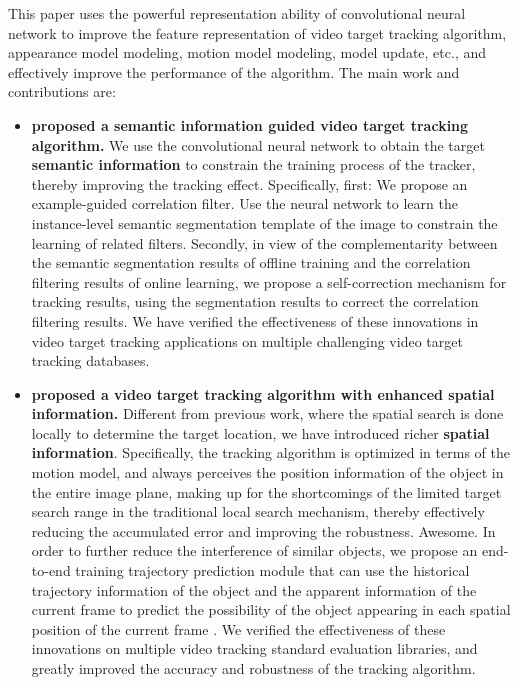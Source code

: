 This paper uses the powerful representation ability of convolutional neural network to improve the feature representation of video target tracking algorithm, appearance model modeling, motion model modeling, model update, etc., and effectively improve the performance of the algorithm. The main work and contributions are:

\begin{itemize}
\item{\textbf{ proposed a semantic information guided video target tracking algorithm. }We use the convolutional neural network to obtain the target \textbf{semantic information} to constrain the training process of the tracker, thereby improving the tracking effect. Specifically, first: We propose an example-guided correlation filter. Use the neural network to learn the instance-level semantic segmentation template of the image to constrain the learning of related filters. Secondly, in view of the complementarity between the semantic segmentation results of offline training and the correlation filtering results of online learning, we propose a self-correction mechanism for tracking results, using the segmentation results to correct the correlation filtering results. We have verified the effectiveness of these innovations in video target tracking applications on multiple challenging video target tracking databases. }
\item{\textbf{ proposed a video target tracking algorithm with enhanced spatial information. }Different from previous work, where the spatial search is done locally to determine the target location, we have introduced richer \textbf{spatial information}. Specifically, the tracking algorithm is optimized in terms of the motion model, and always perceives the position information of the object in the entire image plane, making up for the shortcomings of the limited target search range in the traditional local search mechanism, thereby effectively reducing the accumulated error and improving the robustness. Awesome. In order to further reduce the interference of similar objects, we propose an end-to-end training trajectory prediction module that can use the historical trajectory information of the object and the apparent information of the current frame to predict the possibility of the object appearing in each spatial position of the current frame . We verified the effectiveness of these innovations on multiple video tracking standard evaluation libraries, and greatly improved the accuracy and robustness of the tracking algorithm. }

\end{itemize}
